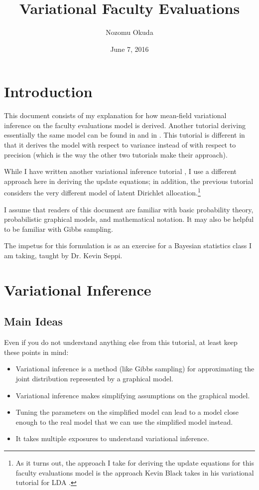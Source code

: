\documentclass[12pt]{article}
\title{Variational Faculty Evaluations}
\author{Nozomu Okuda}
\date{June 7, 2016}
\begin{document}
\maketitle

\section{Introduction}

This document consists of my explanation for how mean-field variational
inference on the faculty evaluations model is derived.  Another tutorial
deriving essentially the same model can be found in \autocite{foxvartut} and in
\autocite{wikivar}.  This tutorial is different in that it derives the model
with respect to variance instead of with respect to precision (which is the way
the other two tutorials make their approach).

While I have written another variational inference tutorial \autocite{myvarlda},
I use a different approach here in deriving the update equations; in addition,
the previous tutorial considers the very different model of latent Dirichlet
allocation.\footnote{As it turns out, the approach I take for deriving the
update equations for this faculty evaluations model is the approach Kevin Black
takes in his variational tutorial for LDA \autocite{kb}.}

I assume that readers of this document are familiar with basic probability
theory, probabilistic graphical models, and mathematical notation.  It may also
be helpful to be familiar with Gibbs sampling.

The impetus for this formulation is as an exercise for a Bayesian statistics
class I am taking, taught by Dr. Kevin Seppi.

\section{Variational Inference}

\subsection{Main Ideas}

Even if you do not understand anything else from this tutorial, at least keep
these points in mind:

\begin{itemize}
    \item Variational inference is a method (like Gibbs sampling) for
        approximating the joint distribution represented by a graphical model.
    \item Variational inference makes simplifying assumptions on the graphical
        model.
    \item Tuning the parameters on the simplified model can lead to a model
        close enough to the real model that we can use the simplified model
        instead.
    \item It takes multiple exposures to understand variational inference.
\end{itemize}
\end{document}
